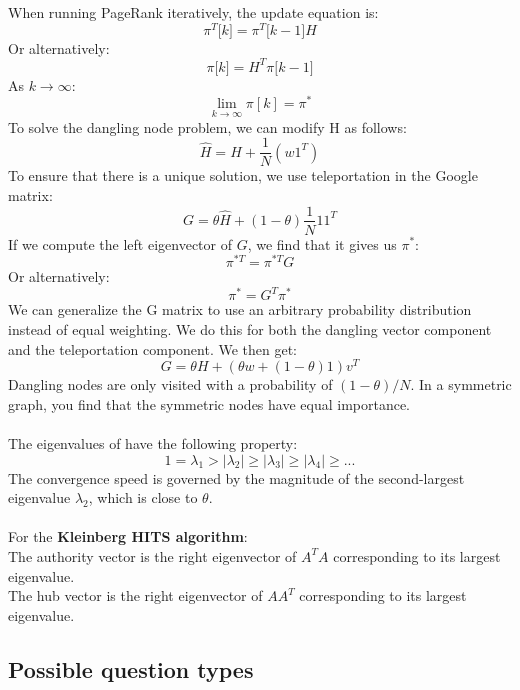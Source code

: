 \documentclass{article}
\newcommand{\MatrixVariable}[1]{\bm{\mathit{#1}}}
\begin{document}
When running PageRank iteratively, the update equation is:
$$\pi^T \lbrack k \rbrack = \pi^T \lbrack k-1 \rbrack \MatrixVariable{H}$$
Or alternatively:
$$\pi \lbrack k \rbrack = \MatrixVariable{H}^T \pi \lbrack k-1 \rbrack$$
As $k \to \infty$:
$$\lim_{k \to \infty}\pi[k] = \pi^*$$
To solve the dangling node problem, we can modify H as follows:
$$\hat{\MatrixVariable{H}} = \MatrixVariable{H} + \frac{1}{N}(\MatrixVariable{w}\MatrixVariable{1}^T) $$
To ensure that there is a unique solution, we use teleportation in the Google matrix:
$$\MatrixVariable{G} = \theta \hat{\MatrixVariable{H}} + (1-\theta) \frac{1}{N}\MatrixVariable{1}\MatrixVariable{1}^T$$
If we compute the left eigenvector of $\MatrixVariable{G}$, we find that it gives us $\pi^*$:
$$\pi^{*T} = \pi^{*T} \MatrixVariable{G}$$
Or alternatively:
$$\pi^* = \MatrixVariable{G}^T \pi^*$$
We can generalize the G matrix to use an arbitrary probability distribution instead of equal weighting. We do this for both the dangling vector component and the teleportation component. We then get:
$$\MatrixVariable{G} = \theta \MatrixVariable{H} + (\theta \MatrixVariable{w} + (1-\theta)\MatrixVariable{1})\MatrixVariable{v}^T$$
Dangling nodes are only visited with a probability of $(1-\theta)/N$. In a symmetric graph, you find that the symmetric nodes have equal importance. \\
\\
The eigenvalues of \MatrixVariable{G} have the following property:
$$1 = \lambda_1 > |\lambda_2| \geq |\lambda_3| \geq |\lambda_4| \geq ...$$
The convergence speed is governed by the magnitude of the second-largest eigenvalue $\lambda_2$, which is close to $\theta$. \\
\\
For the \textbf{Kleinberg HITS algorithm}: \\
The authority vector is the right eigenvector of $\MatrixVariable{A}^T\MatrixVariable{A}$ corresponding to its largest eigenvalue. \\
The hub vector is the right eigenvector of $\MatrixVariable{A}\MatrixVariable{A}^T$ corresponding to its largest eigenvalue. \\

\subsection{Possible question types}
\end{document}
